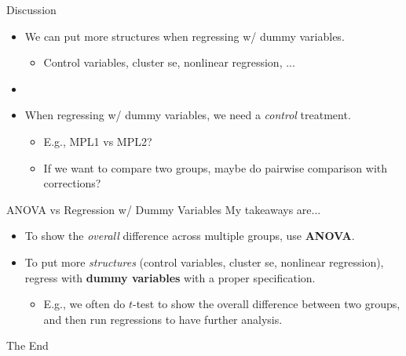\begin{frame}{Discussion}
    \begin{itemize}
        \item[1.] We can put more structures when regressing w/ dummy variables.
        \begin{itemize}
            \item Control variables, cluster se, nonlinear regression, ...
        \end{itemize}
        \item[]
        \item[2.] When regressing w/ dummy variables, we need a \textit{control} treatment.
        \begin{itemize}
            \item E.g., MPL1 vs MPL2?
            \item If we want to compare two groups, maybe do pairwise comparison with corrections?
        \end{itemize}
    \end{itemize}
\end{frame}

\begin{frame}{ANOVA vs Regression w/ Dummy Variables}
My takeaways are...
    \begin{itemize}
        \item To show the \textit{overall} difference across multiple groups, use \textbf{ANOVA}.
        \vspace{3mm}
        \vspace{3mm}
        \item To put more \textit{structures} (control variables, cluster se, nonlinear regression), regress with \textbf{dummy variables} with a proper specification.
        \begin{itemize}
            \item E.g., we often do $t$-test to show the overall difference between two groups, and then run regressions to have further analysis.
        \end{itemize}
    \end{itemize}
\end{frame}

\begin{frame}[noframenumbering]
    \huge{\color{blue}The End}
\end{frame}

